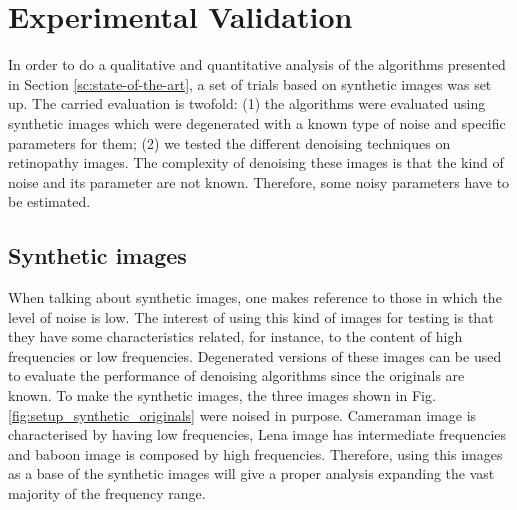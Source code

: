 \section{Experimental Validation} \label{sc:experimental-validation}
In order to do a qualitative and quantitative analysis of the algorithms presented in Section \ref{sc:state-of-the-art}, a set of trials based on synthetic images was set up. The carried evaluation is twofold: (1) the algorithms were evaluated using synthetic images which were degenerated with a known type of noise and specific parameters for them; (2) we tested the different denoising techniques on retinopathy images. The complexity of denoising these images is that the kind of noise and its parameter are not known. Therefore, some noisy parameters have to be estimated.

\subsection{Synthetic images}
When talking about synthetic images, one makes reference to those in which the level of noise is low.  The interest of using this kind of images for testing is that they have some characteristics related, for instance, to the content of high frequencies or low frequencies. Degenerated versions of these images can be used to evaluate the performance of denoising algorithms since the originals are known. To make the synthetic images, the three images shown in Fig. \ref{fig:setup_synthetic_originals} were noised in purpose. Cameraman image is characterised by having low frequencies, Lena image has intermediate frequencies and baboon image is composed by high frequencies. Therefore, using this images as a base of the synthetic images will give a proper analysis expanding the vast majority of the frequency range.

